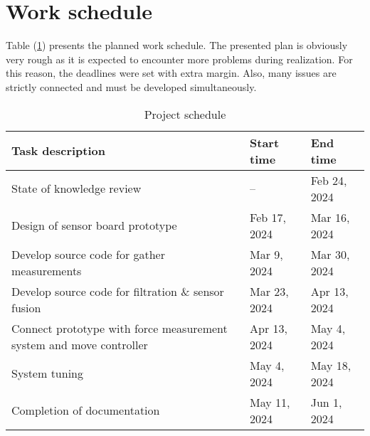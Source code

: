 \section{Work schedule}

Table (\ref{work_schedule}) presents the planned work schedule. The presented plan is obviously very rough as it is expected to encounter more problems during realization. For this reason, the deadlines were set with extra margin. Also, many issues are strictly connected and must be developed simultaneously.

\renewcommand{\arraystretch}{1.5}
\begin{table}[!h]
\centering
\caption{Project schedule}
\begin{tabular}{|m{}|m{}|m{}|} 
\hline
\rowcolor{Gray}
Task description & Start time & End time  \\
\hline
State of knowledge review & -- & Feb 24, 2024 \\
\hline
Design of sensor board prototype & Feb 17, 2024 & Mar 16, 2024 \\
\hline
Develop source code for gather measurements & Mar 9, 2024 & Mar 30, 2024 \\
\hline
Develop source code for filtration \& sensor fusion & Mar 23, 2024 & Apr 13, 2024 \\
\hline
Connect prototype with force measurement system and move controller & Apr 13, 2024 & May 4, 2024 \\
\hline
System tuning & May 4, 2024 & May 18, 2024 \\
\hline
Completion of documentation  & May 11, 2024 & Jun 1, 2024 \\
\hline
\end{tabular}
\label{work_schedule}
\end{table}

